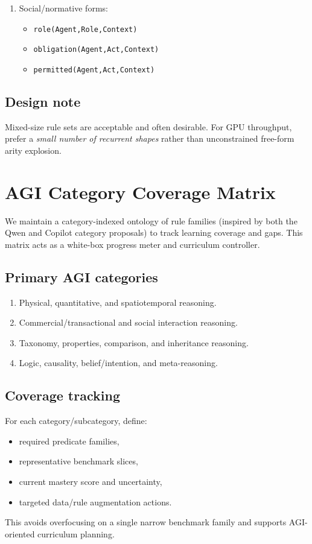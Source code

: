 \documentclass[14pt]{article}
\begin{document}
\begin{enumerate}[leftmargin=1.5em]
\begin{itemize}
    \item \texttt{believes(Agent,Prop,Conf)}
    \item \texttt{goal(Agent,G)}
    \item \texttt{knows(Agent,Fact)}
  \end{itemize}
  \item Social/normative forms:
  \begin{itemize}
    \item \texttt{role(Agent,Role,Context)}
    \item \texttt{obligation(Agent,Act,Context)}
    \item \texttt{permitted(Agent,Act,Context)}
  \end{itemize}
\end{enumerate}

\subsection{Design note}
Mixed-size rule sets are acceptable and often desirable.
For GPU throughput, prefer a \emph{small number of recurrent shapes} rather than unconstrained free-form arity explosion.

\section{AGI Category Coverage Matrix}
We maintain a category-indexed ontology of rule families (inspired by both the Qwen and Copilot category proposals) to track learning coverage and gaps.
This matrix acts as a white-box progress meter and curriculum controller.

\subsection{Primary AGI categories}
\begin{enumerate}[leftmargin=1.5em]
  \item Physical, quantitative, and spatiotemporal reasoning.
  \item Commercial/transactional and social interaction reasoning.
  \item Taxonomy, properties, comparison, and inheritance reasoning.
  \item Logic, causality, belief/intention, and meta-reasoning.
\end{enumerate}

\subsection{Coverage tracking}
For each category/subcategory, define:
\begin{itemize}[leftmargin=1.5em]
  \item required predicate families,
  \item representative benchmark slices,
  \item current mastery score and uncertainty,
  \item targeted data/rule augmentation actions.
\end{itemize}
This avoids overfocusing on a single narrow benchmark family and supports AGI-oriented curriculum planning.
\end{document}
